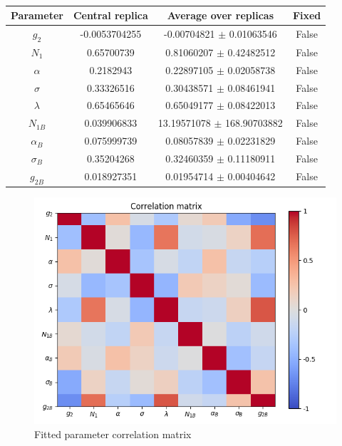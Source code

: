 \documentclass[
]{article}
\begin{document}
\begin{table}[h]

\centering

\begin{tabular}{|c|c|c|c|} \hline

\textbf{Parameter} & \textbf{Central replica} & \textbf{Average over
replicas} & \textbf{Fixed} \\ \hline

\(g_2\) & -0.0053704255 & -0.00704821 \(\pm\)
0.01063546 & False \\ \hline
\(N_1\) & 0.65700739 & 0.81060207 \(\pm\) 0.42482512 & False \\ \hline
\(\alpha\) & 0.2182943 & 0.22897105 \(\pm\) 0.02058738 & False \\ \hline
\(\sigma\) & 0.33326516 & 0.30438571 \(\pm\)
0.08461941 & False \\ \hline
\(\lambda\) & 0.65465646 & 0.65049177 \(\pm\)
0.08422013 & False \\ \hline
\(N_{1B}\) & 0.039906833 & 13.19571078 \(\pm\)
168.90703882 & False \\ \hline
\(\alpha_B\) & 0.075999739 & 0.08057839 \(\pm\)
0.02231829 & False \\ \hline
\(\sigma_B\) & 0.35204268 & 0.32460359 \(\pm\)
0.11180911 & False \\ \hline
\(g_{2B}\) & 0.018927351 & 0.01954714 \(\pm\)
0.00404642 & False \\ \hline

\end{tabular}

\caption{}

\end{table}

\begin{figure}
\centering
\includegraphics{pngplots/CorrelationMatrix.png}
\caption{Fitted parameter correlation matrix}
\end{figure}
\end{document}
